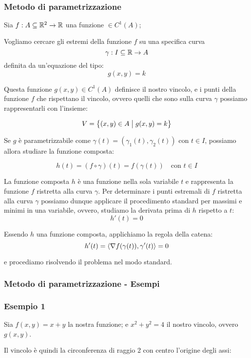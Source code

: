 \pagebreak
\subsubsection{Metodo di parametrizzazione}

Sia \(f: A \subseteq \mathbb{R}^2 \to \mathbb{R} \) una funzione \(\in C^1(A)\);

Vogliamo cercare gli estremi della funzione \(f\) su una specifica curva
\[\gamma : I \subseteq \mathbb{R} \to A\]
definita da un'equazione del tipo:
\[
    g(x,y) = k
\]

Questa funzione \(g(x,y) \in C^{1}(A)\) definisce il nostro vincolo, e i punti della funzione \(f\) che rispettano il vincolo, ovvero quelli che sono sulla curva \(\gamma \) possiamo rappresentarli con l'insieme:

\[
    V = \left\{ (x,y) \in A \;\big|\; g(x,y) = k \right\}
\]

Se \(g\) è parametrizzabile come \(\gamma(t) = (\gamma_1(t), \gamma_2(t))\) con \(t \in I\), possiamo allora studiare la funzione composta:

\[
    h(t) = (f \circ \gamma) (t) = f(\gamma(t)) \quad \text{con } t \in I
\]

La funzione composta \(h\) è una funzione nella sola variabile \(t\) e rappresenta la funzione \(f\) ristretta alla curva \(\gamma \). Per determinare i punti estremali di \(f\) ristretta alla curva \(\gamma \) possiamo dunque applicare il procedimento standard per massimi e minimi in una variabile, ovvero, studiamo la derivata prima di \(h\) rispetto a \(t\):
\[
    h'(t)=0
\]

Essendo \(h\) una funzione composta, applichiamo la regola della catena:
\[
    h'(t) = \langle\nabla f(\gamma(t)),\gamma'(t)\rangle = 0
\]

e procediamo risolvendo il problema nel modo standard.

\pagebreak
\subsubsection{Metodo di parametrizzazione {-} Esempi}

\subsubsection*{Esempio 1}

Sia \(f(x,y) = x + y\) la nostra funzione; e \(x^2 + y^2 = 4\) il nostro vincolo, ovvero \(g(x,y)\).

Il vincolo è quindi la circonferenza di raggio 2 con centro l'origine degli assi:

